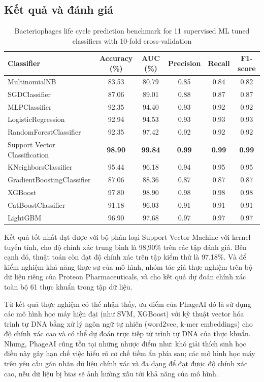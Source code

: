 \subsection{Kết quả và đánh giá}
\begin{table}[ht]
\footnotesize
\centering
\caption{Bacteriophages life cycle prediction benchmark for 11 supervised ML tuned classifiers with 10-fold cross-validation}
\begin{tabular}{lccccc}
\toprule
\textbf{Classifier} & \textbf{Accuracy (\%)} & \textbf{AUC (\%)} & \textbf{Precision} & \textbf{Recall} & \textbf{F1-score} \\
\midrule
MultinomialNB          & 83.53 & 80.79 & 0.85 & 0.84 & 0.82 \\
SGDClassifier          & 87.06 & 89.01 & 0.88 & 0.87 & 0.87 \\
MLPClassifier          & 92.35 & 94.40 & 0.93 & 0.92 & 0.92 \\
LogisticRegression     & 92.94 & 94.53 & 0.93 & 0.93 & 0.93 \\
RandomForestClassifier & 92.35 & 97.42 & 0.92 & 0.92 & 0.92 \\
Support Vector Classification & \textbf{98.90} & \textbf{99.84} & \textbf{0.99} & \textbf{0.99} & \textbf{0.99} \\
KNeighborsClassifier          & 95.44 & 96.18 & 0.94 & 0.95 & 0.95 \\
GradientBoostingClassifier   & 87.06 & 88.36 & 0.87 & 0.87 & 0.87 \\
XGBoost                       & 97.80 & 98.90 & 0.98 & 0.98 & 0.98 \\
CatBoostClassifier           & 91.18 & 96.03 & 0.91 & 0.91 & 0.91 \\
LightGBM                      & 96.90 & 97.68 & 0.97 & 0.97 & 0.97 \\
\bottomrule
\end{tabular}
\end{table}

Kết quả tốt nhất đạt được với bộ phân loại Support Vector Machine với kernel tuyến tính, cho độ chính xác trung bình là 98,90\% trên các tập đánh giá. Bên cạnh đó, thuật toán còn đạt độ chính xác trên tập kiểm thử là 97.18\%. Và để kiểm nghiệm khả năng thực sự của mô hình, nhóm tác giả thực nghiệm trên bộ dữ liệu riêng của Proteon Pharmaceuticals, và cho kết quả dự đoán chính xác toàn bộ 61 thực khuẩn trong tập dữ liệu.

Từ kết quả thực nghiệm có thể nhận thấy, ưu điểm của PhageAI đó là sử dụng các mô hình học máy hiện đại (như SVM, XGBoost) với kỹ thuật vector hóa trình tự DNA bằng xử lý ngôn ngữ tự nhiên (word2vec, k-mer embeddings) cho độ chính xác cao và có thể dự đoán trực tiếp từ trình tự DNA của thực khuẩn. Nhưng, PhageAI cũng tồn tại những nhược điểm như: khó giải thích sinh học điều này gây hạn chế việc hiểu rõ cơ chế tiềm ẩn phía sau; các mô hình học máy trên yêu cầu gán nhãn dữ liệu chính xác và đa dạng để đạt được độ chính xác cao, nếu dữ liệu bị bias sẽ ảnh hưởng xấu tới khả năng của mô hình. 
